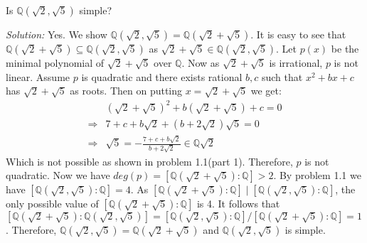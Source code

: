 \documentclass[a4paper, 11pt]{article}
\newenvironment{solution}
    {\textit{Solution:}}
    {}
\begin{document}
\begin{tcolorbox}[colback=c2,colframe=c1,title=Problem 1.4]
    Is $\mathbb{Q}(\sqrt2,\sqrt5)$ simple?
\end{tcolorbox}
\begin{solution}
    Yes. We show $\mathbb{Q}(\sqrt2,\sqrt5)=\mathbb{Q}(\sqrt 2+\sqrt 5)$. It is easy to see that $\mathbb{Q}(\sqrt 2+\sqrt 5)\subseteq \mathbb{Q}(\sqrt2,\sqrt5)$ as $\sqrt2+\sqrt 5\in \mathbb{Q}(\sqrt2,\sqrt5)$. Let $p(x)$ be the minimal polynomial of $\sqrt2+\sqrt 5$ over $\mathbb Q$. Now as $\sqrt2+\sqrt 5$ is irrational, $p$ is not linear. Assume $p$ is quadratic and there exists rational $b,c$ such that $x^2+bx+c$ has $\sqrt2+\sqrt 5$ as roots. Then on putting $x=\sqrt2+\sqrt5$ we get:
    \begin{align*}
        &(\sqrt 2+\sqrt5)^2+b(\sqrt2+\sqrt5)+c=0\\
        \Rightarrow& 7+c+b\sqrt2+(b+2\sqrt2)\sqrt5=0\\
        \Rightarrow&\sqrt5=-\frac{7+c+b\sqrt2}{b+2\sqrt2}\in\mathbb{Q}\sqrt2
    \end{align*}
    Which is not possible as shown in problem 1.1(part 1). Therefore, $p$ is not quadratic. Now we have $deg(p)=[\mathbb Q(\sqrt2+\sqrt5):\mathbb Q]>2$. By problem 1.1 we have $[\mathbb Q(\sqrt2,\sqrt5):\mathbb Q]=4$. As $[\mathbb Q(\sqrt2+\sqrt5):\mathbb Q]\mid[\mathbb Q(\sqrt2,\sqrt5):\mathbb Q]$, the only possible value of $[\mathbb Q(\sqrt2+\sqrt5):\mathbb Q]$ is  4. It follows that $[\mathbb Q(\sqrt2+\sqrt5):\mathbb Q(\sqrt2,\sqrt5)]=[\mathbb Q(\sqrt2,\sqrt5):\mathbb Q]/[\mathbb Q(\sqrt2+\sqrt5):\mathbb Q]=1$. Therefore, $\mathbb{Q}(\sqrt2,\sqrt5)=\mathbb{Q}(\sqrt 2+\sqrt 5)$ and $\mathbb{Q}(\sqrt 2,\sqrt 5)$ is simple.
\end{solution}
\end{document}
